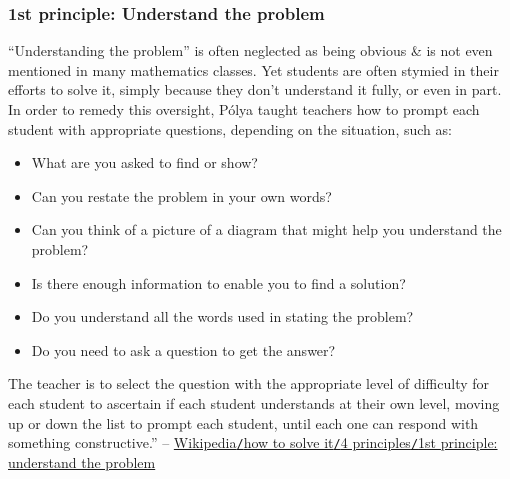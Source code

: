 \documentclass[oneside]{book}
\numberwithin{equation}{section}
\begin{document}
\subsubsection{1st principle: Understand the problem}
``Understanding the problem'' is often neglected as being obvious \& is not even mentioned in many mathematics classes. Yet students are often stymied in their efforts to solve it, simply because they don't understand it fully, or even in part. In order to remedy this oversight, P\'olya taught teachers how to prompt each student with appropriate questions, depending on the situation, such as:
\begin{itemize}
	\item What are you asked to find or show?
	\item Can you restate the problem in your own words?
	\item Can you think of a picture of a diagram that might help you understand the problem?
	\item Is there enough information to enable you to find a solution?
	\item Do you understand all the words used in stating the problem?
	\item Do you need to ask a question to get the answer?
\end{itemize}
The teacher is to select the question with the appropriate level of difficulty for each student to ascertain if each student understands at their own level, moving up or down the list to prompt each student, until each one can respond with something constructive.'' -- \href{https://en.wikipedia.org/wiki/How_to_Solve_It#First_principle:_Understand_the_problem}{Wikipedia\texttt{/}how to solve it\texttt{/}4 principles\texttt{/}1st principle: understand the problem}
\end{document}
